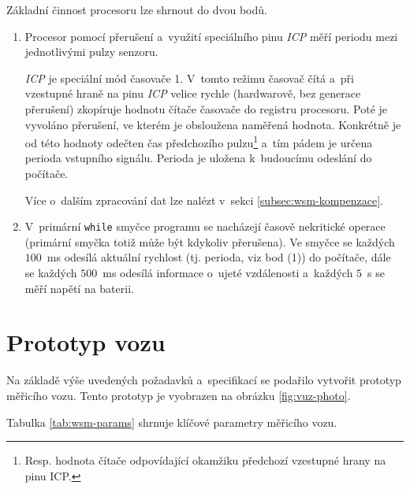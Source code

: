 Základní činnost procesoru lze shrnout do dvou bodů.

\begin{enumerate}
\item Procesor pomocí přerušení a~využití speciálního pinu \textit{\gls{ICP}}
měří periodu mezi jednotlivými pulzy senzoru.

\textit{\gls{ICP}} je speciální mód časovače 1. V~tomto režimu časovač čítá a~při
vzestupné hraně na pinu \textit{\gls{ICP}} velice rychle (hardwarově, bez generace
přerušení) zkopíruje hodnotu čítače časovače do registru procesoru. Poté je
vyvoláno přerušení, ve kterém je obsloužena naměřená hodnota. Konkrétně je od
této hodnoty odečten čas předchozího pulzu\footnote{Resp. hodnota čítače
odpovídající okamžiku předchozí vzestupné hrany na pinu \gls{ICP}.} a~tím pádem je
určena perioda vstupního signálu. Perioda je uložena k~budoucímu odeslání do
počítače.

Více o~dalším zpracování dat lze nalézt v~sekci
\ref{subsec:wsm-kompenzace}.

\item V~primární \texttt{while} smyčce programu se nacházejí časově nekritické
operace (primární smyčka totiž může být kdykoliv přerušena). Ve
smyčce se každých $100$~ms odesílá aktuální rychlost (tj. perioda, viz bod (1))
do počítače, dále se každých $500$~ms odesílá informace o~ujeté vzdálenosti
a~každých $5$~s se měří napětí na baterii.

\end{enumerate}

\section{Prototyp vozu}
\label{sec:wsm-prototype}

Na základě výše uvedených požadavků a~specifikací se podařilo vytvořit prototyp
měřicího vozu. Tento prototyp je vyobrazen na obrázku \ref{fig:vuz-photo}.

Tabulka \ref{tab:wsm-params} shrnuje klíčové parametry měřicího vozu.

